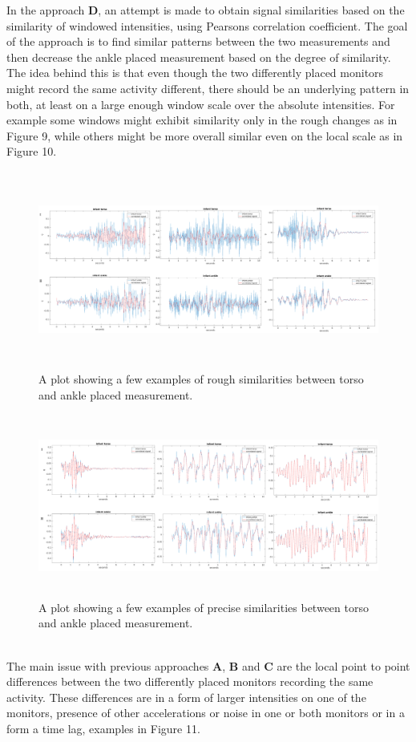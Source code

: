\documentclass{article}
\begin{document}
{In the approach \textbf{D}, an attempt is made to obtain signal similarities based on the similarity of windowed intensities, using Pearsons correlation coefficient. The goal of the approach is to find similar patterns between the two measurements and then decrease the ankle placed measurement based on the degree of similarity. The idea behind this is that even though the two differently placed monitors might record the same activity different, there should be an underlying pattern in both, at least on a large enough window scale over the absolute intensities. For example some windows might exhibit similarity only in the rough changes as in Figure 9, while others might be more overall similar even on the local scale as in Figure 10.
\begin{figure}[h]
\includegraphics[width=15cm, height=6.5cm]{roughSimilar.png}
\caption{A plot showing a few examples of rough similarities between torso and ankle placed measurement.}
\end{figure}
\begin{figure}[h]
\includegraphics[width=15cm, height=6cm]{localSimilar.png}
\caption{A plot showing a few examples of precise similarities between torso and ankle placed measurement.}
\end{figure}
\\
The main issue with previous approaches \textbf{A}, \textbf{B} and \textbf{C} are the local point to point differences between the two differently placed monitors recording the same activity. These differences are in a form of larger intensities on one of the monitors, presence of other accelerations or noise in one or both monitors or in a form a time lag, examples in Figure 11.
}
\end{document}
